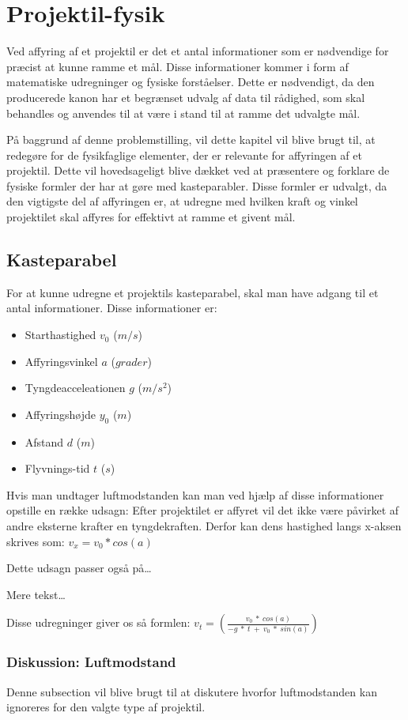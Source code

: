 \chapter{Projektil-fysik}
Ved affyring af et projektil er det et antal informationer som er nødvendige for
præcist at kunne ramme et mål. Disse informationer kommer i form af
matematiske udregninger og fysiske forståelser. Dette er nødvendigt, da den
producerede kanon har et begrænset udvalg af data til rådighed, som skal
behandles og anvendes til at være i stand til at ramme det udvalgte mål.\nl

På baggrund af denne problemstilling, vil dette kapitel vil blive brugt til, at
redegøre for de fysikfaglige elementer, der er relevante for affyringen af et
projektil. Dette vil hovedsageligt blive dækket ved at præsentere og forklare de
fysiske formler der har at gøre med kasteparabler. Disse formler er udvalgt,
da den vigtigste del af affyringen er, at udregne med hvilken kraft og vinkel
projektilet skal affyres for effektivt at ramme et givent mål.\nl

\section{Kasteparabel}
For at kunne udregne et projektils kasteparabel, skal man have adgang til et
antal informationer. Disse informationer er:
\begin{itemize}
  \item Starthastighed $v_0$ ($m/s$)
  \item Affyringsvinkel $a$ ($grader$)
  \item Tyngdeacceleationen $g$ ($m/s^2$)
  \item Affyringshøjde $y_0$ ($m$)
  \item Afstand $d$ ($m$)
  \item Flyvnings-tid $t$ ($s$)
\end{itemize}

Hvis man undtager luftmodstanden kan man ved hjælp af disse informationer
opstille en række udsagn:\nl
Efter projektilet er affyret vil det ikke være påvirket af andre eksterne
krafter en tyngdekraften. Derfor kan dens hastighed langs x-aksen skrives som:
$v_x = v_0 * cos(a)$\nl

Dette udsagn passer også på\ldots \nl

Mere tekst\ldots \nl

Disse udregninger giver os så formlen:\nl
$v_t = (\frac{v_0\ *\ cos(a)}{-g\ *\ t\ +\ v_0\ *\ sin(a)})$

\subsection{Diskussion: Luftmodstand}
Denne subsection vil blive brugt til at diskutere hvorfor luftmodstanden kan
ignoreres for den valgte type af projektil.

